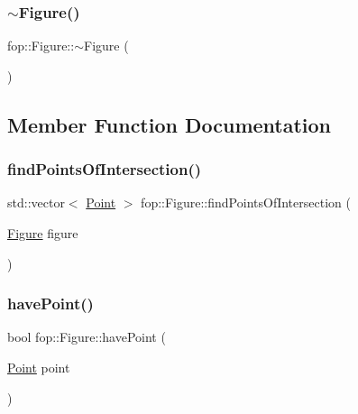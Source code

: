 \mbox{\label{classfop_1_1_figure_ac17b0b902f9d4963f1b98b52e03e7953}} 
\subsubsection{\texorpdfstring{$\sim$\+Figure()}{~Figure()}}
{\footnotesize\ttfamily fop\+::\+Figure\+::$\sim$\+Figure (\begin{DoxyParamCaption}{ }\end{DoxyParamCaption})}



\subsection{Member Function Documentation}
\mbox{\label{classfop_1_1_figure_a65bb58cd0c1cd84f8e8134d3118e760a}} 
\subsubsection{\texorpdfstring{find\+Points\+Of\+Intersection()}{findPointsOfIntersection()}}
{\footnotesize\ttfamily std\+::vector$<$ \mbox{\hyperlink{structtdp_1_1_point}{Point}} $>$ fop\+::\+Figure\+::find\+Points\+Of\+Intersection (\begin{DoxyParamCaption}\item[{\mbox{\hyperlink{classfop_1_1_figure}{Figure}}}]{figure }\end{DoxyParamCaption})}

\mbox{\label{classfop_1_1_figure_adaa195836173f677f9207c0b5f9c84fe}} 
\subsubsection{\texorpdfstring{have\+Point()}{havePoint()}}
{\footnotesize\ttfamily bool fop\+::\+Figure\+::have\+Point (\begin{DoxyParamCaption}\item[{\mbox{\hyperlink{structtdp_1_1_point}{Point}}}]{point }\end{DoxyParamCaption})}

